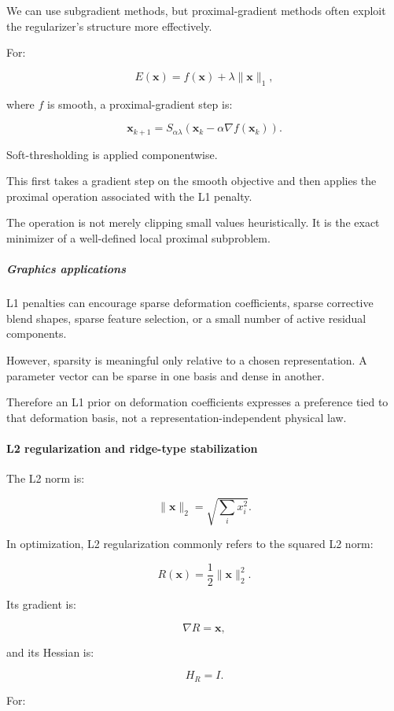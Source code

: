 We can use subgradient methods, but proximal-gradient methods often exploit the regularizer's structure more effectively.

For:

\[
E(\mathbf x)=f(\mathbf x)+\lambda\|\mathbf x\|_1,
\]

where \(f\) is smooth, a proximal-gradient step is:

\[
\boxed{ \mathbf x_{k+1} = S_{\alpha\lambda} \left( \mathbf x_k-\alpha\nabla f(\mathbf x_k) \right) }.
\]

Soft-thresholding is applied componentwise.

This first takes a gradient step on the smooth objective and then applies the proximal operation associated with the L1 penalty.

The operation is not merely clipping small values heuristically. It is the exact minimizer of a well-defined local proximal subproblem.

\subparagraph{Graphics applications}\label{graphics-applications}

L1 penalties can encourage sparse deformation coefficients, sparse corrective blend shapes, sparse feature selection, or a small number of active residual components.

However, sparsity is meaningful only relative to a chosen representation. A parameter vector can be sparse in one basis and dense in another.

Therefore an L1 prior on deformation coefficients expresses a preference tied to that deformation basis, not a representation-independent physical law.

\paragraph{L2 regularization and ridge-type stabilization}\label{l2-regularization-and-ridge-type-stabilization}

The L2 norm is:

\[
\|\mathbf x\|_2= \sqrt{\sum_i x_i^2}.
\]

In optimization, L2 regularization commonly refers to the squared L2 norm:

\[
\boxed{ R(\mathbf x)=\frac12\|\mathbf x\|_2^2 }.
\]

Its gradient is:

\[
\nabla R=\mathbf x,
\]

and its Hessian is:

\[
H_R=I.
\]

For:

